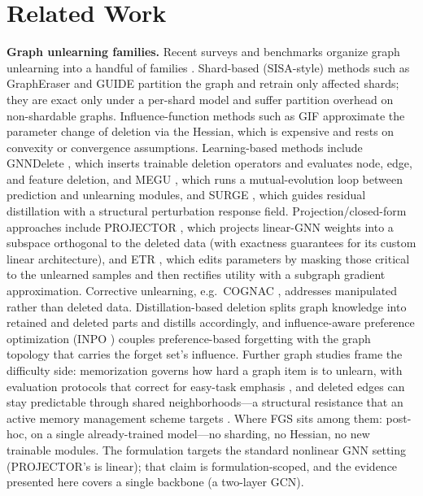 \documentclass[pdflatex,sn-basic,Numbered]{sn-jnl}
\begin{document}
\section{Related Work}
\textbf{Graph unlearning families.} Recent surveys and benchmarks organize graph unlearning into a handful of families \cite{said2023,jain2026,opengu2025}. Shard-based (SISA-style) methods such as GraphEraser \cite{grapheraser2022} and GUIDE \cite{guide2023} partition the graph and retrain only affected shards; they are exact only under a per-shard model and suffer partition overhead on non-shardable graphs. Influence-function methods such as GIF \cite{gif2023} approximate the parameter change of deletion via the Hessian, which is expensive and rests on convexity or convergence assumptions. Learning-based methods include GNNDelete \cite{gnndelete2023}, which inserts trainable deletion operators and evaluates node, edge, and feature deletion, and MEGU \cite{megu2024}, which runs a mutual-evolution loop between prediction and unlearning modules, and SURGE \cite{surge2026}, which guides residual distillation with a structural perturbation response field. Projection/closed-form approaches include PROJECTOR \cite{projector2023}, which projects linear-GNN weights into a subspace orthogonal to the deleted data (with exactness guarantees for its custom linear architecture), and ETR \cite{etr2024}, which edits parameters by masking those critical to the unlearned samples and then rectifies utility with a subgraph gradient approximation. Corrective unlearning, e.g.\ COGNAC \cite{cognac2025}, addresses manipulated rather than deleted data. Distillation-based deletion \cite{d2dgn2023} splits graph knowledge into retained and deleted parts and distills accordingly, and influence-aware preference optimization (INPO \cite{inpo2025}) couples preference-based forgetting with the graph topology that carries the forget set's influence. Further graph studies frame the difficulty side: memorization governs how hard a graph item is to unlearn, with evaluation protocols that correct for easy-task emphasis \cite{dingmemorization2026}, and deleted edges can stay predictable through shared neighborhoods---a structural resistance that an active memory management scheme targets \cite{wangresistance2026}. Where FGS sits among them: post-hoc, on a single already-trained model---no sharding, no Hessian, no new trainable modules. The formulation targets the standard nonlinear GNN setting (PROJECTOR's is linear); that claim is formulation-scoped, and the evidence presented here covers a single backbone (a two-layer GCN).
\end{document}
